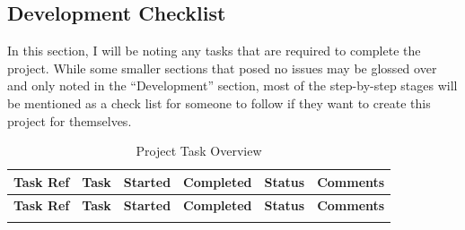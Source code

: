\clearpage
\begin{landscape}

\chapter*{Development Checklist}

In this section, I will be noting any tasks that are required to complete the project. 
While some smaller sections that posed no issues may be glossed over and only noted in 
the ``Development'' section, most of the step-by-step stages will be mentioned as a 
check list for someone to follow if they want to create this project for themselves.

\begin{longtable}{@{}p{1.5cm} p{6.5cm} ccc p{9cm}@{}}
    \caption{Project Task Overview} \label{tab:checklist} \\
    \toprule
    \textbf{Task Ref} & \textbf{Task} & \textbf{Started} & \textbf{Completed} & \textbf{Status} & \textbf{Comments} \\
    \midrule
    \endfirsthead

    \toprule
    \textbf{Task Ref} & \textbf{Task} & \textbf{Started} & \textbf{Completed} & \textbf{Status} & \textbf{Comments} \\
    \midrule
    \endhead

    \bottomrule
    \endfoot

    \bottomrule
    \endlastfoot


\end{longtable}
\end{landscape}
